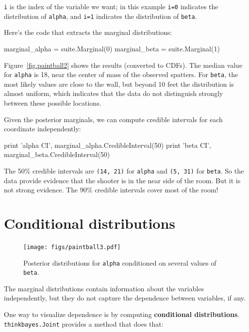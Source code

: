 \documentclass[12pt]{book}
\theoremstyle{exercise}
\begin{document}
{\tt i} is the index of the variable we want; in this example
{\tt i=0} indicates the distribution of {\tt alpha}, and
{\tt i=1} indicates the distribution of {\tt beta}.

Here's the code that extracts the marginal distributions:

\begin{code}
    marginal_alpha = suite.Marginal(0)
    marginal_beta = suite.Marginal(1)
\end{code}

Figure~\ref{fig.paintball2} shows the results (converted to CDFs).
The median value for {\tt alpha} is 18, near the center of mass of
the observed spatters.  For {\tt beta}, the most likely values are
close to the wall, but beyond 10 feet the distribution is almost
uniform, which indicates that the data do not distinguish strongly
between these possible locations.

Given the posterior marginals, we can compute credible intervals
for each coordinate independently:

\begin{code}
    print 'alpha CI', marginal_alpha.CredibleInterval(50)
    print 'beta CI', marginal_beta.CredibleInterval(50)
\end{code}

The 50\% credible intervals are {\tt (14, 21)} for {\tt alpha} and
{\tt (5, 31)} for {\tt beta}.  So the data provide evidence that the
shooter is in the near side of the room.  But it is not strong
evidence.  The 90\% credible intervals cover most of the room!


\section{Conditional distributions}
\label{conditional}

\begin{figure}
\centerline{\texttt{[image: figs/paintball3.pdf]}}
\caption{Posterior distributions for {\tt alpha} conditioned on several values
of {\tt beta}.}
\label{fig.paintball3}
\end{figure}

The marginal distributions contain information about the variables
independently, but they do not capture the dependence between
variables, if any.

One way to visualize dependence is by computing {\bf conditional
distributions}.  {\tt thinkbayes.Joint} provides a method that
does that:
\end{document}
